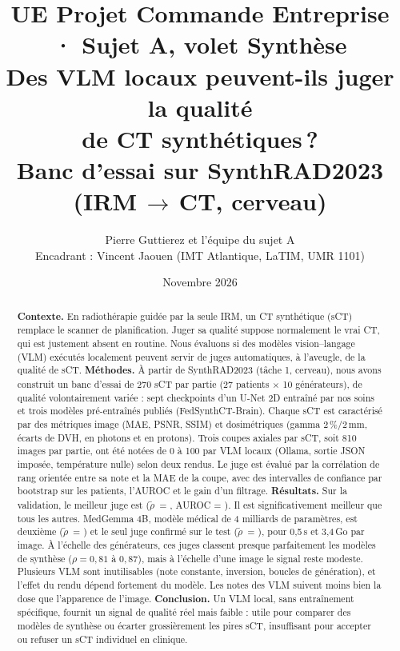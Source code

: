 \documentclass[11pt,a4paper]{article}
\title{\vspace{-1.2cm}%
  {\large\color{gray}UE Projet Commande Entreprise · Sujet A, volet Synthèse}\\[0.6em]
  \textbf{Des VLM locaux peuvent-ils juger la qualité\\ de CT synthétiques\,?}\\[0.3em]
  {\large Banc d'essai sur SynthRAD2023 (IRM\,$\rightarrow$\,CT, cerveau)}}
\author{Pierre Guttierez et l'équipe du sujet A\\[0.2em]
  {\small Encadrant : Vincent Jaouen (IMT Atlantique, LaTIM, UMR 1101)}}
\date{Novembre 2026}
\newcommand{\rhot}{\tilde{\rho}}
\begin{document}
\maketitle
\thispagestyle{fancy}

\begin{abstract}
\noindent\textbf{Contexte.} En radiothérapie guidée par la seule IRM, un CT synthétique (sCT) remplace le scanner de planification. Juger sa qualité suppose normalement le vrai CT, qui est justement absent en routine. Nous évaluons si des modèles vision--langage (VLM) exécutés localement peuvent servir de juges automatiques, à l'aveugle, de la qualité de sCT.
\textbf{Méthodes.} À partir de SynthRAD2023 (tâche 1, cerveau), nous avons construit un banc d'essai de 270 sCT par partie (27 patients $\times$ 10 générateurs), de qualité volontairement variée : sept checkpoints d'un U-Net 2D entraîné par nos soins et trois modèles pré-entraînés publiés (FedSynthCT-Brain). Chaque sCT est caractérisé par des métriques image (MAE, PSNR, SSIM) et dosimétriques (gamma 2\,\%/2\,mm, écarts de DVH, en photons et en protons). Trois coupes axiales par sCT, soit 810 images par partie, ont été notées de 0 à 100 par \nModelsVal{} VLM locaux (Ollama, sortie JSON imposée, température nulle) selon deux rendus. Le juge est évalué par la corrélation de rang orientée entre sa note et la MAE de la coupe, avec des intervalles de confiance par bootstrap sur les patients, l'AUROC et le gain d'un filtrage.
\textbf{Résultats.} Sur la validation, le meilleur juge est \bestVal{} ($\rhot$~= \bestValRho{}, AUROC = \bestValAuroc{}). Il est significativement meilleur que tous les autres. MedGemma 4B, modèle médical de 4 milliards de paramètres, est deuxième ($\rhot$~= \medValRho{}) et le seul juge confirmé sur le test ($\rhot$~= \medTestRho{}), pour 0,5\,s et 3,4\,Go par image. À l'échelle des générateurs, ces juges classent presque parfaitement les modèles de synthèse ($\rho = 0{,}81$ à $0{,}87$), mais à l'échelle d'une image le signal reste modeste. Plusieurs VLM sont inutilisables (note constante, inversion, boucles de génération), et l'effet du rendu dépend fortement du modèle. Les notes des VLM suivent moins bien la dose que l'apparence de l'image.
\textbf{Conclusion.} Un VLM local, sans entraînement spécifique, fournit un signal de qualité réel mais faible : utile pour comparer des modèles de synthèse ou écarter grossièrement les pires sCT, insuffisant pour accepter ou refuser un sCT individuel en clinique.
\end{abstract}
\end{document}
